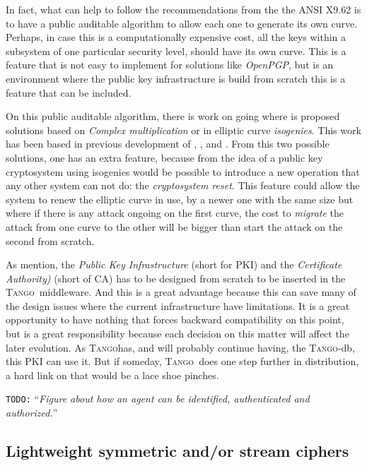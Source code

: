 \documentclass[10pt,a4paper,twoside]{llncs}
\newcommand{\todo}[1]{\texttt{\color{red}TODO:} ``\emph{#1}''}
\newcommand{\tango}{\textsc{Tango}}
\begin{document}
In fact, what can help to follow the recommendations from the the ANSI X9.62 is to have a public auditable algorithm to allow each one to generate its own curve. Perhaps, in case this is a computationally expensive cost, all the keys within a subsystem of one particular security level, should have its own curve. This is a feature that is not easy to implement for solutions like \emph{OpenPGP}, but is an environment where the public key infrastructure is build from scratch this is a feature that can be included.

On this public auditable algorithm, there is work on going \cite{secRickShareECs} where is proposed solutions based on \emph{Complex multiplication} or in elliptic curve \emph{isogenies}. This work has been based in previous development of \cite{Ramiro05}, \cite{Rostovtsev06public} \cite{Rosana11}, and \cite{JValera11}. From this two possible solutions, one has an extra feature, because from the idea of a public key cryptosystem using isogenies \cite{Rostovtsev06public} would be possible to introduce a new operation that any other system can not do: the \emph{cryptosystem reset}. This feature could allow the system to renew the elliptic curve in use, by a newer one with the same size but where if there is any attack ongoing on the first curve, the cost to \emph{migrate} the attack from one curve to the other will be bigger than start the attack on the second from scratch.

As mention, the \emph{Public Key Infrastructure} (short for PKI) and the \emph{Certificate Authority)} (short of CA) has to be designed from scratch to be inserted in the \tango\, middleware. And this is a great advantage because this can save many of the design issues where the current infrastructure have limitations. It is a great opportunity to have nothing that forces backward compatibility on this point, but is a great responsibility because each decision on this matter will affect the later evolution. As \tango has, and will probably continue having, the \tango-db, this PKI can use it. But if someday, \tango\, does one step further in distribution, a hard link on that would be a lace shoe pinches.

\todo{Figure about how an agent can be identified, authenticated and authorized.}


\subsection{Lightweight symmetric and/or stream ciphers}\label{sec:encryption}
\end{document}
